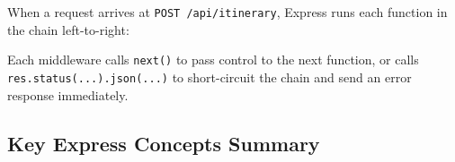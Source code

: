 \documentclass[12pt,a4paper]{article}
\begin{document}
When a request arrives at \texttt{POST /api/itinerary}, Express runs each function
in the chain left-to-right:


Each middleware calls \texttt{next()} to pass control to the next function, or calls
\texttt{res.status(...).json(...)} to short-circuit the chain and send an error
response immediately.

\subsection{Key Express Concepts Summary}
\end{document}
